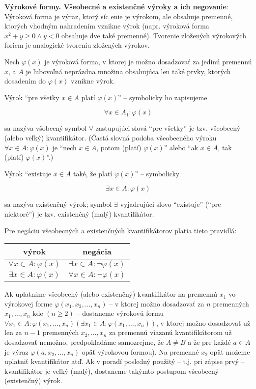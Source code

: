 \textbf{Výrokové formy. Všeobecné a existenčné výroky a ich negovanie}:
Výroková forma je výraz, ktorý síc enie je výrokom, ale obsahuje premenné,
ktorých vhodným nahradením vznikne výrok (napr. výroková forma $x^2 + y \geq 0
\land y < 0$ obsahuje dve také premenné). Tvorenie zložených výrokových foriem
je analogické tvoreniu zložených výrokov.

Nech $\varphi (x)$ je výroková forma, v ktorej je možno dosadzovať za jedinú
premennú $x$, a $A$ je ľubovoľná neprázdna množina obsahujúca len také prvky,
ktorých dosadením do $\varphi (x)$ vznikne výrok.

Výrok \enquote{pre všetky $x \in A$ platí $\varphi (x)$} -- symbolicky ho zapisujeme

$$\forall x \in A_1: \varphi (x)$$

sa nazýva všobecný symbol $\forall$ zastupujúci slová \enquote{pre všetky} je
tzv. všeobecný (alebo veľký) kvantifikátor. (Častá slovná podoba všeobecného
výroku $\forall x \in A : \varphi (x)$ je \enquote{nech $x \in A$, potom
(platí) $\varphi (x)$} alebo \enquote{ak $x \in A$, tak (platí) $\varphi
(x)$}.)

Výrok \enquote{existuje $x \in A$ také, že platí $\varphi (x)$} -- symbolicky

$$\exists x \in A : \varphi (x)$$

sa nazýva existenčný výrok; symbol $\exists$ vyjadrujúci slovo
\enquote{existuje} (\enquote{pre niektoré}) je tzv. existenčný (malý)
kvantifikátor.

Pre negáciu všeobecných a existenčných kvantifikátorov platia tieto pravidlá:

\begin{center}
  \begin{tabular}{c | c}
    výrok & negácia \\
    \hline
    $\forall x \in A : \varphi (x)$ & $\exists x \in A : \neg \varphi (x)$ \\
    $\exists x \in A : \varphi (x)$ & $\forall x \in A : \neg \varphi (x)$
  \end{tabular}
\end{center}

Ak uplatníme všeobecný (alebo existenčný) kvantifikátor na premennú $x_1$ vo
výrokovej forme $\varphi(x_1, x_2, \ldots, x_n)$ -- v ktorej možno dosadzovať za
$n$ premenných $x_1, \ldots, x_n$ kde $(n \geq 2)$ -- dostaneme výrokovú formu
$\forall x_1 \in A: \varphi (x_1, \ldots, x_n) (\exists x_1 \in A: \varphi
(x_1, \ldots, x_n))$, v ktorej možno dosadzovať už len za $n - 1$ premenných
$x_2, \ldots, x_n$ za premennú viazanú kvantifikátorom už dosadzovať nemožno,
predpokladáme samozrejme, že $A \neq B$ a že pre každé $a \in A$ je výraz
$\varphi (a, x_2, \ldots, x_n)$ opäť výrokovou formou). Na premenné $x_2$ opäť
možeme uplatniť kvantifikátor atď. Ak v poradí posledný použitý -- t.j. pri
zápise prvý -- kvantifikátor je veľký (malý), dostaneme takýmto postupom
všeobecný (existenčný) výrok.

